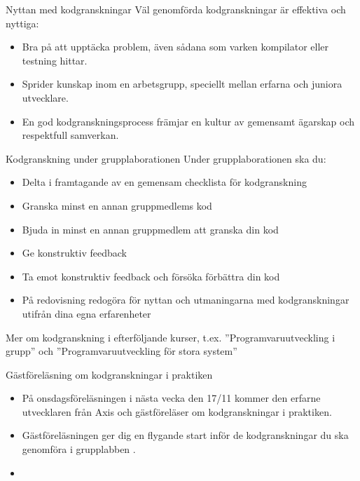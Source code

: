 \begin{Slide}{Nyttan med kodgranskningar}
Väl genomförda kodgranskningar är effektiva och nyttiga:
\begin{itemize}
\item Bra på att upptäcka problem, även sådana som varken kompilator eller testning hittar.
\item Sprider kunskap inom en arbetsgrupp, speciellt mellan erfarna och juniora utvecklare.
\item En god kodgranskningsprocess främjar en kultur av gemensamt ägarskap och respektfull samverkan.
\end{itemize}
\end{Slide}


\begin{Slide}{Kodgranskning under grupplaborationen}
Under grupplaborationen ska du:
\begin{itemize}
\item Delta i framtagande av en gemensam checklista för kodgranskning
\item Granska minst en annan gruppmedlems kod 
\item Bjuda in minst en annan gruppmedlem att granska din kod
\item Ge konstruktiv feedback
\item Ta emot konstruktiv feedback och försöka förbättra din kod
\item På redovisning redogöra för nyttan och utmaningarna med kodgranskningar utifrån dina egna erfarenheter
\end{itemize}
Mer om kodgranskning i efterföljande kurser, t.ex. ''Programvaruutveckling i grupp'' och ''Programvaruutveckling för stora system''
\end{Slide}

\ifkompendium\else
\begin{Slide}{Gästföreläsning om kodgranskningar i praktiken}
\begin{itemize}
\item På onsdagsföreläsningen i nästa vecka den 17/11 kommer den erfarne utvecklaren  från Axis och gästföreläser om kodgranskningar i praktiken. 
\item Gästföreläsningen ger dig en flygande start inför de kodgranskningar du ska genomföra i grupplabben .
\item {}
\end{itemize}
\end{Slide}
\fi
